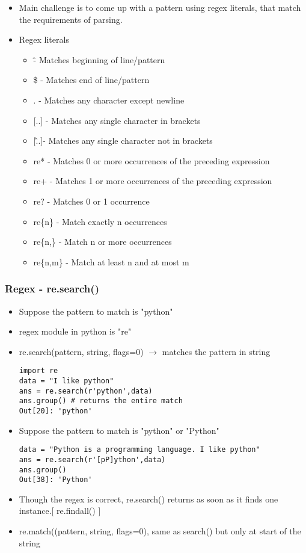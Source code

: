 \documentclass[xcolor=table,10pt]{beamer}
\begin{document}
\begin{frame}
\begin{itemize}
\item Main challenge is to come up with a pattern using regex literals, that match the requirements of parsing.
\item Regex literals
	\begin{itemize}
		\item \^ - Matches beginning of line/pattern
		\item \$ - Matches end of line/pattern
		\item . - Matches any character except newline
		\item {[}..{]} - Matches any single character in brackets
		\item {[}\^..{]}- Matches any single character not in brackets
		\item re* - Matches 0 or more occurrences of the preceding expression
		\item re+ - Matches 1 or more occurrences of the preceding expression
		\item re? - Matches 0 or 1 occurrence
		\item re\{n\} - Match exactly n occurrences
		\item re\{n,\} - Match n or more occurrences
		\item re\{n,m\} - Match at least n and at most m
   	\end{itemize}
\end{itemize}
\end{frame}

\begin{frame}[fragile]
\frametitle{Regex - re.search()}
\begin{itemize}
\item Suppose the pattern to match is "python"
\item regex module in python is "re"
\item re.search(pattern, string, flags=0) $\rightarrow$ matches the pattern in string\\

\begin{verbatim}
import re
data = "I like python"
ans = re.search(r'python',data)
ans.group() # returns the entire match
Out[20]: 'python'
\end{verbatim}
\small
\item Suppose the pattern to match is "python" or "Python"\\

\begin{verbatim}
data = "Python is a programming language. I like python"
ans = re.search(r'[pP]ython',data)
ans.group()
Out[38]: 'Python'
\end{verbatim}
\small
\item Though the regex is correct, re.search() returns as soon as it finds one instance.{[} re.findall() {]}
\item re.match((pattern, string, flags=0), same as search() but only at start of the string 
\end{itemize}
\end{frame}
\end{document}
